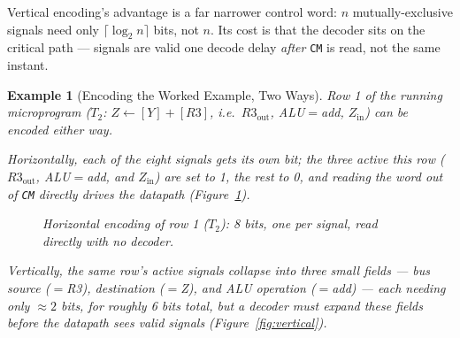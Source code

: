 \documentclass[11pt]{article}
\newtheorem{example}{Example}[section]
\begin{document}
Vertical encoding's advantage is a far narrower control word: $n$ mutually-exclusive signals need only $\lceil \log_2 n \rceil$ bits, not $n$. Its cost is that the decoder sits on the critical path --- signals are valid one decode delay \emph{after} \texttt{CM} is read, not the same instant.

\begin{example}[Encoding the Worked Example, Two Ways]
Row 1 of the running microprogram ($T_2$: $Z \gets [Y]+[R3]$, i.e.\ $R3_{\text{out}}$, ALU$=$add, $Z_{\text{in}}$) can be encoded either way.

Horizontally, each of the eight signals gets its own bit; the three active this row ($R3_{\text{out}}$, ALU$=$add, and $Z_{\text{in}}$) are set to 1, the rest to 0, and reading the word out of \texttt{CM} directly drives the datapath (Figure~\ref{fig:horizontal}).

\begin{figure}[h]
  \centering
  \caption{Horizontal encoding of row 1 ($T_2$): 8 bits, one per signal, read directly with no decoder.}
  \label{fig:horizontal}
\end{figure}

Vertically, the same row's active signals collapse into three small fields --- bus source ($=$R3), destination ($=$Z), and ALU operation ($=$add) --- each needing only $\approx 2$ bits, for roughly 6 bits total, but a decoder must expand these fields before the datapath sees valid signals (Figure~\ref{fig:vertical}).


\end{example}
\end{document}
